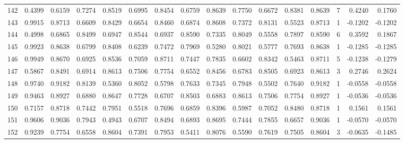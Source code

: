 \begin{tabular}{lrrrrrrrrrrrrrrr}
142 &      0.4399 &  0.6159 &  0.7274 &  0.8519 &  0.6995 &  0.8454 &  0.6759 &  0.8639 &  0.7750 &  0.6672 &   0.8381 &     0.8639 &      7 &                    0.4240 &                     0.1760 \\
143 &      0.9915 &  0.8713 &  0.6609 &  0.8429 &  0.6654 &  0.8460 &  0.6874 &  0.8608 &  0.7372 &  0.8131 &   0.5523 &     0.8713 &      1 &                   -0.1202 &                    -0.1202 \\
144 &      0.4998 &  0.6865 &  0.8499 &  0.6947 &  0.8544 &  0.6937 &  0.8590 &  0.7335 &  0.8049 &  0.5558 &   0.7897 &     0.8590 &      6 &                    0.3592 &                     0.1867 \\
145 &      0.9923 &  0.8638 &  0.6799 &  0.8408 &  0.6239 &  0.7472 &  0.7969 &  0.5280 &  0.8021 &  0.5777 &   0.7693 &     0.8638 &      1 &                   -0.1285 &                    -0.1285 \\
146 &      0.9949 &  0.8670 &  0.6925 &  0.8536 &  0.7059 &  0.8711 &  0.7447 &  0.7835 &  0.6602 &  0.8342 &   0.5463 &     0.8711 &      5 &                   -0.1238 &                    -0.1279 \\
147 &      0.5867 &  0.8491 &  0.6914 &  0.8613 &  0.7506 &  0.7754 &  0.6552 &  0.8456 &  0.6783 &  0.8505 &   0.6923 &     0.8613 &      3 &                    0.2746 &                     0.2624 \\
148 &      0.9740 &  0.9182 &  0.8139 &  0.5360 &  0.8052 &  0.5798 &  0.7633 &  0.7345 &  0.7948 &  0.5502 &   0.7640 &     0.9182 &      1 &                   -0.0558 &                    -0.0558 \\
149 &      0.9463 &  0.8927 &  0.6880 &  0.8647 &  0.7728 &  0.6707 &  0.8503 &  0.6883 &  0.8613 &  0.7506 &   0.7754 &     0.8927 &      1 &                   -0.0536 &                    -0.0536 \\
150 &      0.7157 &  0.8718 &  0.7442 &  0.7951 &  0.5518 &  0.7696 &  0.6859 &  0.8396 &  0.5987 &  0.7052 &   0.8480 &     0.8718 &      1 &                    0.1561 &                     0.1561 \\
151 &      0.9606 &  0.9036 &  0.7943 &  0.4943 &  0.6707 &  0.8494 &  0.6893 &  0.8695 &  0.7444 &  0.7855 &   0.6657 &     0.9036 &      1 &                   -0.0570 &                    -0.0570 \\
152 &      0.9239 &  0.7754 &  0.6558 &  0.8604 &  0.7391 &  0.7953 &  0.5411 &  0.8076 &  0.5590 &  0.7619 &   0.7505 &     0.8604 &      3 &                   -0.0635 &                    -0.1485 \\

\end{tabular}
